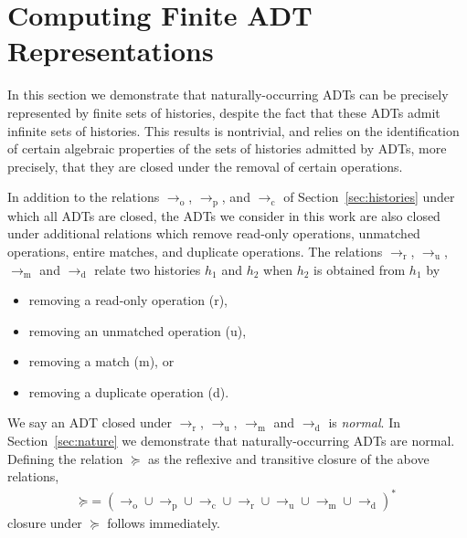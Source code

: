 \section{Computing Finite ADT Representations}
\label{sec:patterns}

In this section we demonstrate that naturally-occurring ADTs can be precisely
represented by finite sets of histories, despite the fact that these ADTs admit
infinite sets of histories. This results is nontrivial, and relies on the
identification of certain algebraic properties of the sets of histories
admitted by ADTs, more precisely, that they are
closed under the removal of certain operations. 

In addition to the relations $\to_\mathrm{o}$, $\to_\mathrm{p}$, and
$\to_\mathrm{c}$ of Section~\ref{sec:histories} under which all ADTs are
closed, the ADTs we consider in this work are also closed under additional
relations which remove read-only operations, unmatched operations, entire
matches, and duplicate operations. The relations $\to_\mathrm{r}$,
$\to_\mathrm{u}$, $\to_\mathrm{m}$ and $\to_\mathrm{d}$ relate two histories
$h_1$ and $h_2$ when $h_2$ is obtained from $h_1$ by
\begin{itemize}

  \item removing a read-only operation (r),

  \item removing an unmatched operation (u),

  \item removing a match (m), or

  \item removing a duplicate operation (d).

\end{itemize}
We say an ADT closed under $\to_\mathrm{r}$, $\to_\mathrm{u}$, $\to_\mathrm{m}$
and $\to_\mathrm{d}$ is \emph{normal}. In Section~\ref{sec:nature} we
demonstrate that naturally-occurring ADTs are normal. Defining the relation
$\succeq$ as the reflexive and transitive closure of the above relations,
\begin{align*}
  \mathord{\succeq} = (
    \to_\mathrm{o} \cup \to_\mathrm{p} \cup \to_\mathrm{c} \cup 
    \to_\mathrm{r} \cup \to_\mathrm{u} \cup \to_\mathrm{m} \cup \to_\mathrm{d}
  )^\ast
\end{align*}
closure under $\succeq$ follows immediately.

